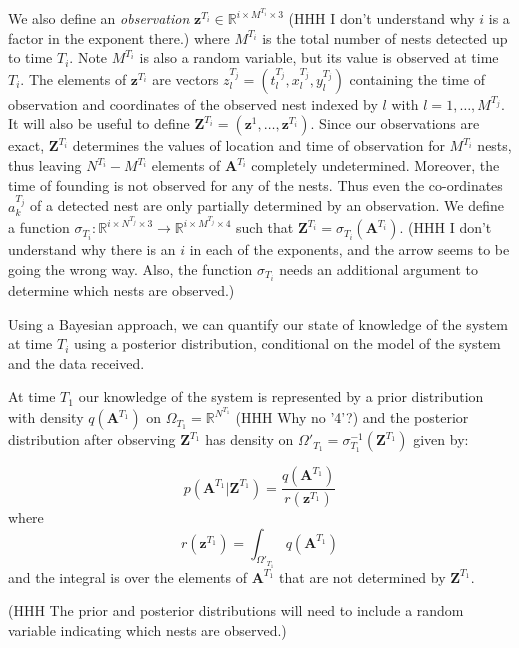 \documentclass{article}
\renewcommand{\vec}[1]{\mathbf{#1}}
\begin{document}
We also define an \textit{observation} $\vec{z}^{T_i} \in \mathbb{R}^{i \times M^{T_i} \times 3}$ (HHH I don't understand why $i$ is a factor in the exponent there.) where $M^{T_i}$ is the total number of nests detected up to time $T_i$. Note $M^{T_i}$ is also a random variable, but its value is observed at time $T_i$. The elements of $\vec{z}^{T_i}$ are vectors $z^{T_j}_l = (t^{T_j}_l, x^{T_j}_l, y^{T_j}_l)$ containing the time of observation and coordinates of the observed nest indexed by $l$ with $l = 1, \dots, M^{T_j}$. It will also be useful to define $\vec{Z}^{T_i} = (\vec{z}^1, \dots, \vec{z}^{T_i})$. Since our observations are exact, $\vec{Z}^{T_i}$ determines the values of location and time of observation for $M^{T_i}$ nests, thus leaving $N^{T_i}-M^{T_i}$ elements of $\vec{A}^{T_i}$ completely undetermined. Moreover, the time of founding is not observed for any of the nests. Thus even the co-ordinates $a^{T_j}_k$ of a detected nest are only partially determined by an observation. We define a function $\sigma_{T_i}: \mathbb{R}^{i\times N^{T_j}\times 3} \rightarrow \mathbb{R}^{i\times M^{T_j}\times 4}$ such that $\vec{Z}^{T_i} = \sigma_{T_i}(\vec{A}^{T_i})$. (HHH I don't understand why there is an $i$ in each of the exponents, and the arrow seems to be going the wrong way. Also, the function $\sigma_{T_i}$ needs an additional argument to determine which nests are observed.)

Using a Bayesian approach, we can quantify our state of knowledge of the system at time $T_i$ using a posterior distribution, conditional on the model of the system and the data received.

At time $T_1$ our knowledge of the system is represented by a prior distribution with density $q(\vec{A}^{T_1})$ on $\Omega_{T_1} = \mathbb{R}^{N^{T_1}}$ (HHH Why no '4'?) and the posterior distribution after observing $\vec{Z}^{T_1}$ has density on $\Omega'_{T_1} = \sigma_{T_1}^{-1}(\vec{Z}^{T_1})$ given by:

\begin{equation*}
    p(\vec{A}^{T_1} | \vec{Z}^{T_1}) = \frac{q(\vec{A}^{T_1})}{r(\vec{z}^{T_1})}
\end{equation*}
where
\begin{equation*}
    r(\vec{z}^{T_1}) = \int_{\Omega'_{T_1}} q(\vec{A}^{T_1}) 
\end{equation*}
and the integral is over the elements of $\vec{A}^{T_1}$ that are not determined by $\vec{Z}^{T_1}$.

(HHH The prior and posterior distributions will need to include a random variable indicating which nests are observed.)
\end{document}
